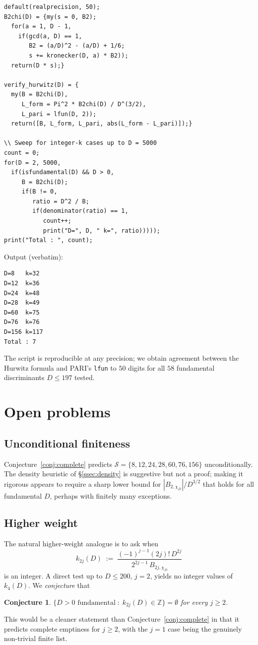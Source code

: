 \documentclass[11pt,reqno]{amsart}
\theoremstyle{plain}
\newtheorem{conjecture}[theorem]{Conjecture}
\theoremstyle{definition}
\newcommand{\Z}{\mathbb{Z}}
\begin{document}
\begin{verbatim}
default(realprecision, 50);
B2chi(D) = {my(s = 0, B2);
  for(a = 1, D - 1,
    if(gcd(a, D) == 1,
       B2 = (a/D)^2 - (a/D) + 1/6;
       s += kronecker(D, a) * B2));
  return(D * s);}

verify_hurwitz(D) = {
  my(B = B2chi(D),
     L_form = Pi^2 * B2chi(D) / D^(3/2),
     L_pari = lfun(D, 2));
  return([B, L_form, L_pari, abs(L_form - L_pari)]);}

\\ Sweep for integer-k cases up to D = 5000
count = 0;
for(D = 2, 5000,
  if(isfundamental(D) && D > 0,
     B = B2chi(D);
     if(B != 0,
        ratio = D^2 / B;
        if(denominator(ratio) == 1,
           count++;
           print("D=", D, " k=", ratio)))));
print("Total : ", count);
\end{verbatim}

Output (verbatim):
\begin{verbatim}
D=8   k=32
D=12  k=36
D=24  k=48
D=28  k=49
D=60  k=75
D=76  k=76
D=156 k=117
Total : 7
\end{verbatim}

The script is reproducible at any precision; we obtain agreement
between the Hurwitz formula and PARI's \texttt{lfun} to $50$ digits
for all $58$ fundamental discriminants $D\le 197$ tested.

\section{Open problems}\label{sec:open}

\subsection{Unconditional finiteness}
Conjecture~\ref{conj:complete} predicts $\mathcal{S}=\{8,12,24,28,60,76,156\}$
unconditionally.  The density heuristic of \S\ref{ssec:density} is
suggestive but not a proof; making it rigorous appears to require a
sharp lower bound for $|B_{2,\chi_{D}}|/D^{3/2}$ that holds for all
fundamental $D$, perhaps with finitely many exceptions.

\subsection{Higher weight}
The natural higher-weight analogue is to ask when
\begin{equation}\label{eq:k-higher}
k_{2j}(D)\;:=\;\frac{(-1)^{j-1}(2j)!\,D^{2j}}{2^{2j-1}\,B_{2j,\chi_{D}}}
\end{equation}
is an integer.  A direct test up to $D\le 200$, $j=2$, yields no
integer values of $k_{4}(D)$.  We \emph{conjecture} that
\begin{conjecture}\label{conj:higher-empty}
$\{D>0\text{ fundamental}\;:\;k_{2j}(D)\in\Z\}=\emptyset$ for every
$j\ge 2$.
\end{conjecture}
This would be a cleaner statement than Conjecture~\ref{conj:complete}
in that it predicts complete emptiness for $j\ge 2$, with the
$j=1$ case being the genuinely non-trivial finite list.
\end{document}
